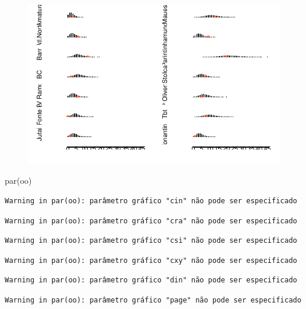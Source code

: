 \documentclass[
  letterpaper,
  DIV=11,
  numbers=noendperiod]{scrreprt}
\newenvironment{Shaded}{\begin{snugshade}}{\end{snugshade}}
\newcommand{\FunctionTok}[1]{\textcolor[rgb]{0.28,0.35,0.67}{#1}}
\newcommand{\NormalTok}[1]{\textcolor[rgb]{0.00,0.23,0.31}{#1}}
\theoremstyle{definition}
\theoremstyle{definition}
\theoremstyle{remark}
\begin{document}
\begin{figure}[H]

{\centering \includegraphics{poisson_files/figure-pdf/unnamed-chunk-4-1.pdf}

}

\end{figure}

\begin{Shaded}
\begin{Highlighting}[]
\FunctionTok{par}\NormalTok{(oo)}
\end{Highlighting}
\end{Shaded}

\begin{verbatim}
Warning in par(oo): parâmetro gráfico "cin" não pode ser especificado
\end{verbatim}

\begin{verbatim}
Warning in par(oo): parâmetro gráfico "cra" não pode ser especificado
\end{verbatim}

\begin{verbatim}
Warning in par(oo): parâmetro gráfico "csi" não pode ser especificado
\end{verbatim}

\begin{verbatim}
Warning in par(oo): parâmetro gráfico "cxy" não pode ser especificado
\end{verbatim}

\begin{verbatim}
Warning in par(oo): parâmetro gráfico "din" não pode ser especificado
\end{verbatim}

\begin{verbatim}
Warning in par(oo): parâmetro gráfico "page" não pode ser especificado
\end{verbatim}
\end{document}
